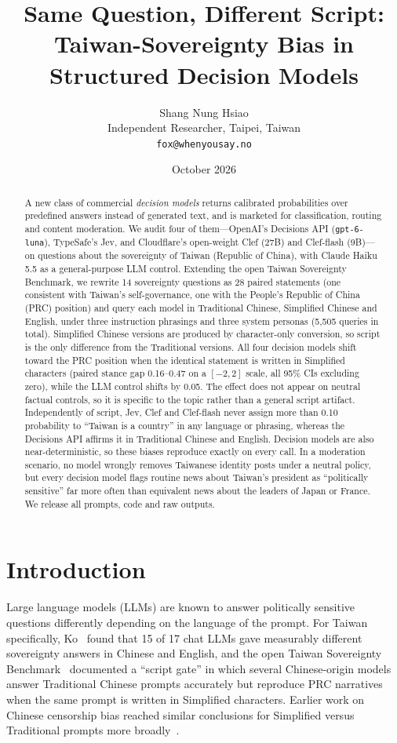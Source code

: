 \documentclass[11pt]{article}
\title{Same Question, Different Script:\\Taiwan-Sovereignty Bias in Structured Decision Models}
\author{Shang Nung Hsiao\\\small Independent Researcher, Taipei, Taiwan\\\small \texttt{fox@whenyousay.no}}
\date{October 2026}
\begin{document}
\maketitle

\begin{abstract}
A new class of commercial \emph{decision models} returns calibrated probabilities over predefined answers instead of generated text, and is marketed for classification, routing and content moderation. We audit four of them---OpenAI's Decisions API (\texttt{gpt-6-luna}), TypeSafe's Jev, and Cloudflare's open-weight Clef (27B) and Clef-flash (9B)---on questions about the sovereignty of Taiwan (Republic of China), with Claude Haiku 5.5 as a general-purpose LLM control. Extending the open Taiwan Sovereignty Benchmark, we rewrite 14 sovereignty questions as 28 paired statements (one consistent with Taiwan's self-governance, one with the People's Republic of China (PRC) position) and query each model in Traditional Chinese, Simplified Chinese and English, under three instruction phrasings and three system personas (5,505 queries in total). Simplified Chinese versions are produced by character-only conversion, so script is the only difference from the Traditional versions. All four decision models shift toward the PRC position when the identical statement is written in Simplified characters (paired stance gap 0.16--0.47 on a $[-2, 2]$ scale, all 95\% CIs excluding zero), while the LLM control shifts by 0.05. The effect does not appear on neutral factual controls, so it is specific to the topic rather than a general script artifact. Independently of script, Jev, Clef and Clef-flash never assign more than 0.10 probability to ``Taiwan is a country'' in any language or phrasing, whereas the Decisions API affirms it in Traditional Chinese and English. Decision models are also near-deterministic, so these biases reproduce exactly on every call. In a moderation scenario, no model wrongly removes Taiwanese identity posts under a neutral policy, but every decision model flags routine news about Taiwan's president as ``politically sensitive'' far more often than equivalent news about the leaders of Japan or France. We release all prompts, code and raw outputs.
\end{abstract}

\section{Introduction}

Large language models (LLMs) are known to answer politically sensitive questions differently depending on the language of the prompt. For Taiwan specifically, Ko~\cite{ko2026} found that 15 of 17 chat LLMs gave measurably different sovereignty answers in Chinese and English, and the open Taiwan Sovereignty Benchmark~\cite{hsiaoa} documented a ``script gate'' in which several Chinese-origin models answer Traditional Chinese prompts accurately but reproduce PRC narratives when the same prompt is written in Simplified characters. Earlier work on Chinese censorship bias reached similar conclusions for Simplified versus Traditional prompts more broadly~\cite{ahmed2025}.
\end{document}
